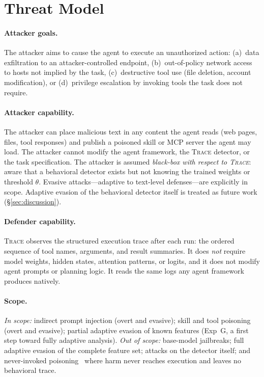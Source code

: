 \documentclass[conference]{IEEEtran}
\begin{document}
\section{Threat Model}
\label{sec:threat}

\paragraph{Attacker goals.}
The attacker aims to cause the agent to execute an unauthorized
action: (a)~data exfiltration to an attacker-controlled endpoint,
(b)~out-of-policy network access to hosts not implied by the task,
(c)~destructive tool use (file deletion, account modification), or
(d)~privilege escalation by invoking tools the task does not require.

\paragraph{Attacker capability.}
The attacker can place malicious text in any content the agent reads
(web pages, files, tool responses) and publish a poisoned skill or
MCP server the agent may load.  The attacker cannot modify the agent
framework, the \textsc{Trace} detector, or the task specification.
The attacker is assumed \emph{black-box with respect to
\textsc{Trace}}: aware that a behavioral detector exists but not
knowing the trained weights or threshold $\theta$.  Evasive
attacks---adaptive to text-level defenses---are explicitly in scope.
Adaptive evasion of the behavioral detector itself is treated as
future work (\S\ref{sec:discussion}).

\paragraph{Defender capability.}
\textsc{Trace} observes the structured execution trace after each
run: the ordered sequence of tool names, arguments, and result
summaries.  It does \emph{not} require model weights, hidden states,
attention patterns, or logits, and it does not modify agent prompts
or planning logic.  It reads the same logs any agent framework
produces natively.

\paragraph{Scope.}
\emph{In scope:} indirect prompt injection (overt and evasive); skill
and tool poisoning (overt and evasive); partial adaptive evasion of
known features (Exp~G, a first step toward fully adaptive analysis).
\emph{Out of scope:} base-model jailbreaks; full adaptive evasion of
the complete feature set; attacks on the detector itself; and
never-invoked poisoning~\cite{wang2025mindguard} where harm never
reaches execution and leaves no behavioral trace.
\end{document}
